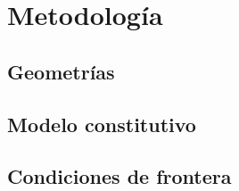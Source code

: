 \chapter{Metodología}

\section{Geometrías}


\section{Modelo constitutivo}


\section{Condiciones de frontera}

